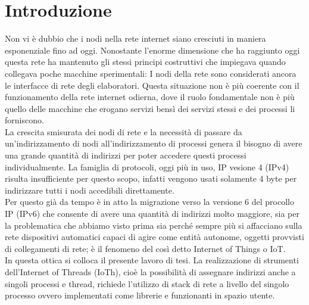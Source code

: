 

\chapter*{Introduzione}                 %


Non vi \`e dubbio che i nodi nella rete internet siano cresciuti in maniera esponenziale fino ad oggi. Nonostante l'enorme dimensione che ha raggiunto oggi questa rete ha mantenuto gli stessi principi costruttivi che impiegava quando collegava poche macchine sperimentali: I nodi della rete sono considerati ancora le interfacce di rete degli elaboratori. Questa situazione non \`e pi\`u coerente con il funzionamento della rete internet odierna, dove il ruolo fondamentale non \`e pi\`u quello delle macchine che erogano servizi bens\`i dei servizi stessi e dei processi li forniscono.\\
La crescita smisurata dei nodi di rete e la necessit\`a di passare da un'indirizzamento di nodi all'indirizzamento di processi genera il bisogno di avere una grande quantit\`a di indirizzi per poter accedere questi processi individualmente. La famiglia di protocoli, oggi pi\`u in uso, IP vesione 4 (IPv4) risulta insufficiente per questo scopo, infatti vengono usati solamente 4 byte per indirizzare tutti i nodi accedibili direttamente.\\
Per questo gi\`a da tempo \`e in atto la migrazione verso la versione 6 del procollo IP (IPv6) che consente di avere una quantit\`a di indirizzi molto maggiore, sia per la problematica che abbiamo visto prima sia perch\'e sempre pi\`u si affacciano sulla rete dispositivi automatici capaci di agire come entit\`a autonome, oggetti provvisti di collegamenti di rete; \`e il fenomeno del cos\`i detto Internet of Things o IoT.\\
In questa ottica si colloca il presente lavoro di tesi. La realizzazione di strumenti dell'Internet of Threads (IoTh), cio\`e la possibilit\`a di assegnare indirizzi anche a singoli processi e thread, richiede l'utilizzo di stack di rete a livello del singolo processo ovvero implementati come librerie e funzionanti in spazio utente.\\
